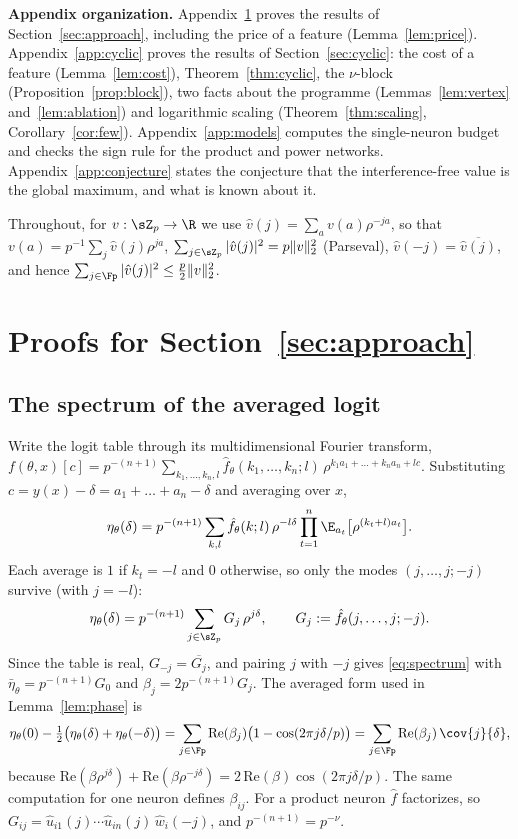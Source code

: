 \textbf{Appendix organization.} Appendix~\ref{app:approach} proves the results of Section~\ref{sec:approach}, including the price of a feature (Lemma~\ref{lem:price}). Appendix~\ref{app:cyclic} proves the results of Section~\ref{sec:cyclic}: the cost of a feature (Lemma~\ref{lem:cost}), Theorem~\ref{thm:cyclic}, the $\nu$-block (Proposition~\ref{prop:block}), two facts about the programme (Lemmas~\ref{lem:vertex} and~\ref{lem:ablation}) and logarithmic scaling (Theorem~\ref{thm:scaling}, Corollary~\ref{cor:few}). Appendix~\ref{app:models} computes the single-neuron budget and checks the sign rule for the product and power networks. Appendix~\ref{app:conjecture} states the conjecture that the interference-free value is the global maximum, and what is known about it.

Throughout, for $v:\sZ_p\to\R$ we use $\hat v(j)=\sum_av(a)\rho^{-ja}$, so that $v(a)=p^{-1}\sum_j\hat v(j)\rho^{ja}$, $\sum_{j\in\sZ_p}|\hat v(j)|^2=p\|v\|_2^2$ (Parseval), $\hat v(-j)=\overline{\hat v(j)}$, and hence $\sum_{j\in\Fp}|\hat v(j)|^2\le\frac p2\|v\|_2^2$.

\section{Proofs for Section~\ref{sec:approach}}\label{app:approach}

\subsection{The spectrum of the averaged logit}\label{app:spectrum}

Write the logit table through its multidimensional Fourier transform,
$f(\theta,x)[c]=p^{-(n+1)}\sum_{k_1,\dots,k_n,l}\hat f_\theta(k_1,\dots,k_n;l)\,\rho^{k_1a_1+\dots+k_na_n+lc}$. Substituting $c=y(x)-\delta=a_1+\dots+a_n-\delta$ and averaging over $x$,
\[
\eta_\theta(\delta)=p^{-(n+1)}\sum_{k,l}\hat f_\theta(k;l)\,\rho^{-l\delta}\prod_{t=1}^n\E_{a_t}\big[\rho^{(k_t+l)a_t}\big].
\]
Each average is $1$ if $k_t=-l$ and $0$ otherwise, so only the modes $(j,\dots,j;-j)$ survive (with $j=-l$):
\[
\eta_\theta(\delta)=p^{-(n+1)}\sum_{j\in\sZ_p}G_j\,\rho^{j\delta},\qquad G_j:=\hat f_\theta(j,\dots,j;-j).
\]
Since the table is real, $G_{-j}=\overline{G_j}$, and pairing $j$ with $-j$ gives \eqref{eq:spectrum} with $\bar\eta_\theta=p^{-(n+1)}G_0$ and $\beta_j=2p^{-(n+1)}G_j$. The averaged form used in Lemma~\ref{lem:phase} is
\[
\eta_\theta(0)-\tfrac12\big(\eta_\theta(\delta)+\eta_\theta(-\delta)\big)=\sum_{j\in\Fp}\mathrm{Re}(\beta_j)\big(1-\cos(2\pi j\delta/p)\big)=\sum_{j\in\Fp}\mathrm{Re}(\beta_j)\,\cov{j}{\delta},
\]
because $\mathrm{Re}(\beta\rho^{j\delta})+\mathrm{Re}(\beta\rho^{-j\delta})=2\,\mathrm{Re}(\beta)\cos(2\pi j\delta/p)$. The same computation for one neuron defines $\beta_{ij}$. For a product neuron $\hat f$ factorizes, so $G_{ij}=\hat u_{i1}(j)\cdots\hat u_{in}(j)\,\hat w_i(-j)$, and $p^{-(n+1)}=p^{-\nu}$.

